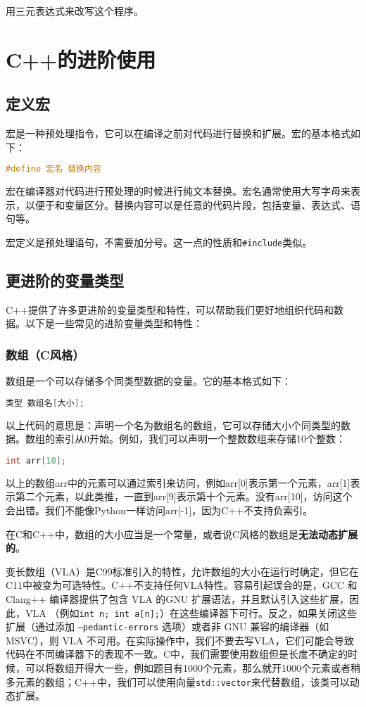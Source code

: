 \documentclass[../main.tex]{subfiles}
\begin{document}
\begin{exercise}
  用三元表达式来改写这个程序。
\end{exercise}

\section{C++的进阶使用}

\subsection{定义宏}

宏是一种预处理指令，它可以在编译之前对代码进行替换和扩展。宏的基本格式如下：
\begin{lstlisting}[language=C++]
#define 宏名 替换内容
\end{lstlisting}
宏在编译器对代码进行预处理的时候进行纯文本替换。宏名通常使用大写字母来表示，以便于和变量区分。替换内容可以是任意的代码片段，包括变量、表达式、语句等。

宏定义是预处理语句，不需要加分号。这一点的性质和\texttt{\#include}类似。

\subsection{更进阶的变量类型}
C++提供了许多更进阶的变量类型和特性，可以帮助我们更好地组织代码和数据。以下是一些常见的进阶变量类型和特性：
\subsubsection{数组（C风格）}

数组是一个可以存储多个同类型数据的变量。它的基本格式如下：
\begin{lstlisting}[language=C++]
类型 数组名[大小];
\end{lstlisting}
以上代码的意思是：声明一个名为数组名的数组，它可以存储大小个同类型的数据。数组的索引从0开始。例如，我们可以声明一个整数数组来存储10个整数：
\begin{lstlisting}[language=C++]
int arr[10];
\end{lstlisting}
以上的数组arr中的元素可以通过索引来访问，例如arr[0]表示第一个元素，arr[1]表示第二个元素，以此类推，一直到arr[9]表示第十个元素。没有arr[10]，访问这个会出错。我们不能像Python一样访问arr[-1]，因为C++不支持负索引。

在C和C++中，数组的大小应当是一个常量，或者说C风格的数组是\textbf{无法动态扩展的}。

\begin{caution}
  变长数组（VLA）是C99标准引入的特性，允许数组的大小在运行时确定，但它在C11中被变为可选特性。C++不支持任何VLA特性。容易引起误会的是，GCC 和 Clang++ 编译器提供了包含 VLA 的GNU 扩展语法，并且默认引入这些扩展，因此，VLA （例如\texttt{int n; int a[n];}）在这些编译器下可行。反之，如果关闭这些扩展（通过添加 \texttt{--pedantic-errors} 选项）或者非 GNU 兼容的编译器（如 MSVC），则 VLA 不可用。在实际操作中，我们不要去写VLA，它们可能会导致代码在不同编译器下的表现不一致。C中，我们需要使用数组但是长度不确定的时候，可以将数组开得大一些，例如题目有1000个元素，那么就开1000个元素或者稍多元素的数组；C++中，我们可以使用向量\texttt{std::vector}来代替数组，该类可以动态扩展。
\end{caution}
\end{document}
